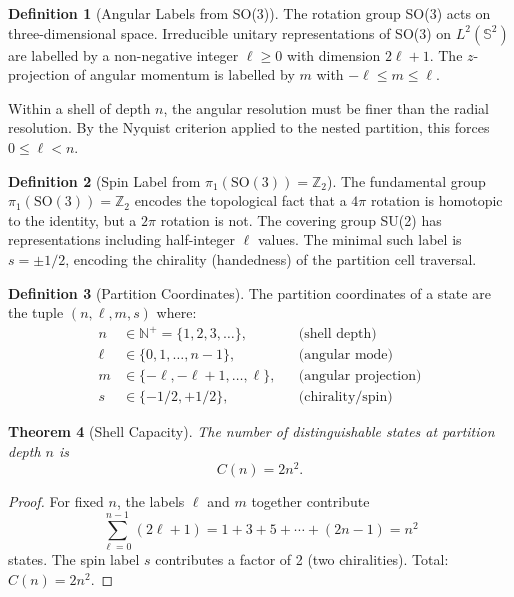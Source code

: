 \documentclass[11pt,twocolumn,a4paper]{article}
\newtheorem{theorem}{Theorem}[section]
\theoremstyle{definition}
\newtheorem{definition}[theorem]{Definition}
\begin{document}
\begin{definition}[Angular Labels from SO(3)]
The rotation group SO(3) acts on three-dimensional space. Irreducible unitary representations of SO(3) on $L^2(\mathbb{S}^2)$ are labelled by a non-negative integer $\ell \geq 0$ with dimension $2\ell+1$. The $z$-projection of angular momentum is labelled by $m$ with $-\ell \leq m \leq \ell$.

Within a shell of depth $n$, the angular resolution must be finer than the radial resolution. By the Nyquist criterion applied to the nested partition, this forces $0 \leq \ell < n$.
\end{definition}

\begin{definition}[Spin Label from $\pi_1(\text{SO}(3)) = \mathbb{Z}_2$]
The fundamental group $\pi_1(\text{SO}(3)) = \mathbb{Z}_2$ encodes the topological fact that a $4\pi$ rotation is homotopic to the identity, but a $2\pi$ rotation is not. The covering group SU(2) has representations including half-integer $\ell$ values. The minimal such label is $s = \pm 1/2$, encoding the chirality (handedness) of the partition cell traversal.
\end{definition}

\begin{definition}[Partition Coordinates]
\label{def:partition-coords}
The partition coordinates of a state are the tuple $(n, \ell, m, s)$ where:
\begin{align*}
n &\in \mathbb{N}^+ = \{1,2,3,\ldots\}, & & \text{(shell depth)} \\
\ell &\in \{0,1,\ldots,n-1\}, & & \text{(angular mode)} \\
m &\in \{-\ell, -\ell+1, \ldots, \ell\}, & & \text{(angular projection)} \\
s &\in \{-1/2, +1/2\}, & & \text{(chirality/spin)}
\end{align*}
\end{definition}

\begin{theorem}[Shell Capacity]
\label{thm:shell-capacity}
The number of distinguishable states at partition depth $n$ is
\begin{equation}
C(n) = 2n^2.
\end{equation}
\end{theorem}

\begin{proof}
For fixed $n$, the labels $\ell$ and $m$ together contribute
\[
\sum_{\ell=0}^{n-1}(2\ell+1) = 1+3+5+\cdots+(2n-1) = n^2
\]
states. The spin label $s$ contributes a factor of 2 (two chiralities). Total: $C(n) = 2n^2$.
\end{proof}
\end{document}
